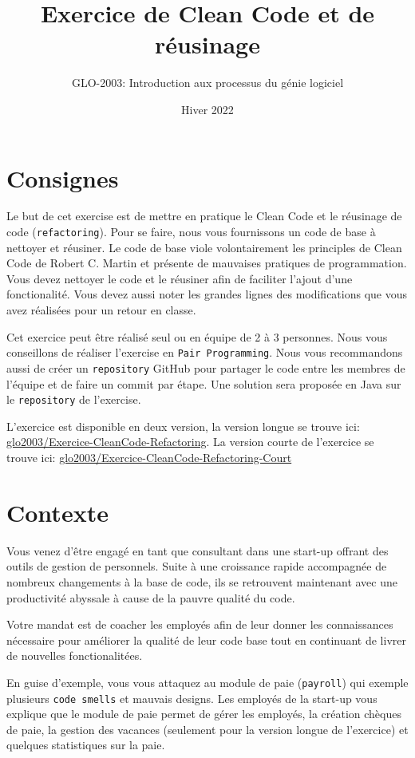\documentclass[french]{article}
\title{Exercice de Clean Code et de réusinage}
\author{GLO-2003: Introduction aux processus du génie logiciel}
\date{Hiver 2022}
\begin{document}
\maketitle

\section{Consignes}
Le but de cet exercise est de mettre en pratique le Clean Code et le réusinage de code (\texttt{refactoring}). Pour se faire, nous vous fournissons un code de base à nettoyer et réusiner. Le code de base viole volontairement les principles de Clean Code de Robert C. Martin\cite{martinClean} et présente de mauvaises pratiques de programmation. Vous devez nettoyer le code et le réusiner afin de faciliter l'ajout d'une fonctionalité. Vous devez aussi noter les grandes lignes des modifications que vous avez réalisées pour un retour en classe.

Cet exercice peut être réalisé seul ou en équipe de 2 à 3 personnes. Nous vous conseillons de réaliser l'exercise en \texttt{Pair Programming}. Nous vous recommandons aussi de créer un \texttt{repository} GitHub pour partager le code entre les membres de l'équipe et de faire un commit par étape. Une solution sera proposée en Java sur le \texttt{repository} de l'exercise.

L'exercice est disponible en deux version, la version longue se trouve ici: \href{https://github.com/glo2003/Exercice-CleanCode-Refactoring}{glo2003/Exercice-CleanCode-Refactoring}. La version courte de l'exercice se trouve ici: \href{https://github.com/glo2003/Exercice-CleanCode-Refactoring-Court}{glo2003/Exercice-CleanCode-Refactoring-Court}

\section{Contexte}
Vous venez d'être engagé en tant que consultant dans une start-up offrant des outils de gestion de personnels. Suite à une croissance rapide accompagnée de nombreux changements à la base de code, ils se retrouvent maintenant avec une productivité abyssale à cause de la pauvre qualité du code.

Votre mandat est de coacher les employés afin de leur donner les connaissances nécessaire pour améliorer la qualité de leur code base tout en continuant de livrer de nouvelles fonctionalitées.

En guise d'exemple, vous vous attaquez au module de paie (\texttt{payroll}) qui exemple plusieurs \texttt{code smells} et mauvais designs. Les employés de la start-up vous explique que le module de paie permet de gérer les employés, la création chèques de paie, la gestion des vacances (seulement pour la version longue de l'exercice) et quelques statistiques sur la paie.
\end{document}
